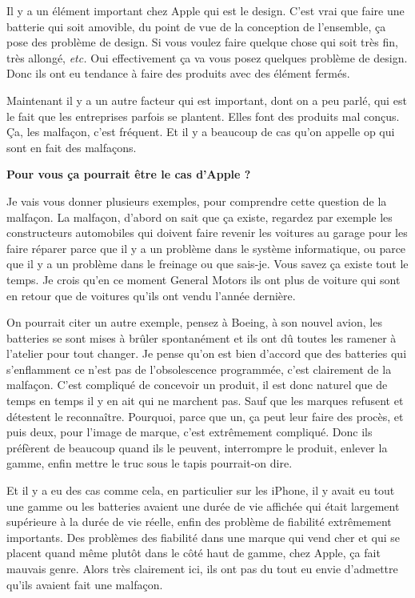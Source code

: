 \begin{small}
Il y a un élément important chez Apple qui est le design. C'est vrai que faire une batterie qui soit amovible, du point de vue de la conception de l'ensemble, ça pose des problème de design. Si vous voulez faire quelque chose qui soit très fin, très allongé, \textit{etc.} Oui effectivement ça va vous posez quelques problème de design. Donc ils ont eu tendance à faire des produits avec des élément fermés.

Maintenant il y a un autre facteur qui est important, dont on a peu parlé, qui est le fait que les entreprises parfois se plantent. Elles font des produits mal conçus. Ça, les malfaçon, c'est fréquent. Et il y a beaucoup de cas qu'on appelle op qui sont en fait des malfaçons.

\textbf{Pour vous ça pourrait être le cas d'Apple ?}
\smallbreak


Je vais vous donner plusieurs exemples, pour comprendre cette question de la malfaçon. La malfaçon, d'abord on sait que ça existe, regardez par exemple les constructeurs automobiles qui doivent faire revenir les voitures au garage pour les faire réparer parce que il y a un problème dans le système informatique, ou parce que il y a un problème dans le freinage ou que sais-je. Vous savez ça existe tout le temps. Je crois qu'en ce moment General Motors ils ont plus de voiture qui sont en retour que de voitures qu'ils ont vendu l'année dernière. 

On pourrait citer un autre exemple, pensez à Boeing, à son nouvel avion, les batteries se sont mises à brûler spontanément et ils ont dû toutes les ramener à l'atelier pour tout changer. Je pense qu'on est bien d'accord que des batteries qui s'enflamment ce n'est pas de l'obsolescence programmée, c'est clairement de la malfaçon. C'est compliqué de concevoir un produit, il est donc naturel que de temps en temps il y en ait qui ne marchent pas. Sauf que les marques refusent et détestent le reconnaître. Pourquoi, parce que un, ça peut leur faire des procès, et puis deux, pour l'image de marque, c'est extrêmement compliqué. Donc ils préfèrent de beaucoup quand ils le peuvent, interrompre le produit, enlever la gamme, enfin \og mettre le truc sous le tapis\fg{} pourrait-on dire. 

Et il y a eu des cas comme cela, en particulier sur les iPhone, il y avait eu tout une gamme ou les batteries avaient une durée de vie affichée qui était largement supérieure à la durée de vie réelle, enfin des problème de fiabilité extrêmement importants. Des problèmes des fiabilité dans une marque qui vend cher et qui se placent quand même plutôt dans le côté haut de gamme, chez Apple, ça fait mauvais genre. Alors très clairement ici, ils ont pas du tout eu envie d'admettre qu'ils avaient fait une malfaçon.


\end{small}
